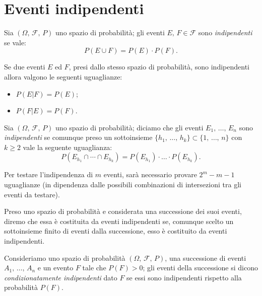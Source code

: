     \section{Eventi indipendenti}
        \begin{defn}\label{defn:Eventi_indipendenti}
            Sia $(\Omega,\,\mathscr{F},\,P)$ uno spazio di probabilità; gli eventi $E,\,F \in \mathscr{F}$ sono \emph{indipendenti} se vale: \[
                P(E \cup F) = P(E) \cdot P(F)
            .\] 
        \end{defn}
        \begin{obsv}
            Se due eventi $E$ ed $F$, presi dallo stesso spazio di probabilità, sono indipendenti allora valgono le seguenti uguaglianze:
            \begin{itemize}
                \item $P(E|F) = P(E)$;
                \item $P(F|E) = P(F)$.
            \end{itemize}
        \end{obsv}
        \begin{defn}
            Sia $(\Omega,\,\mathscr{F},\,P)$ uno spazio di probabilità; diciamo che gli eventi $E_1,\, \ldots,\, E_n$ sono \emph{indipendenti} se comunque preso un sottoinsieme $\{h_1,\, \ldots,\, h_k\} \subset \{1,\, \ldots,\, n\}$ con $k \geq 2$ vale la seguente uguaglianza: \[
                P(E_{h_1} \cap \dotsm \cap E_{h_k}) = P(E_{h_1}) \cdot \ldots \cdot P(E_{h_k})
            .\] 
        \end{defn}
        \begin{obsv}
            Per testare l'indipendenza di $m$ eventi, sarà necessario provare $2^{m} - m - 1$ uguaglianze (in dipendenza dalle possibili combinazioni di intersezioni tra gli eventi da testare).
        \end{obsv}
        \begin{defn}
            Preso uno spazio di probabilità e considerata una successione dei suoi eventi, diremo che essa è costituita da eventi indipendenti se, comunque scelto un sottoinsieme finito di eventi dalla successione, esso è costituito da eventi indipendenti.
        \end{defn}
        \begin{defn}
            Consideriamo uno spazio di probabilità $(\Omega,\,\mathscr{F},\,P)$, una successione di eventi $A_1,\, \ldots,\, A_n$ e un evento $F$ tale che $P(F) > 0$; gli eventi della successione si dicono \emph{condizionatamente indipendenti} dato $F$ se essi sono indipendenti rispetto alla probabilità $P(F)$.
        \end{defn}
